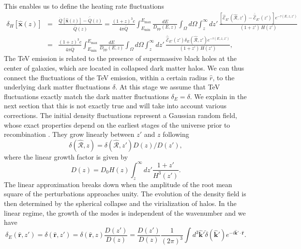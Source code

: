\documentclass[numberedappendix]{emulateapj}
\begin{document}
This enables us to define the heating rate fluctuations
\begin{eqnarray}
\label{eq:fluc_exp0}
\delta_H[\mathbf{\hat{x}}(z)]&=&\frac{\dot{Q}[\mathbf{\hat{x}}(z)]-\bar{\dot{Q}}(z)}{\bar{\dot{Q}}(z)}=\frac{(1+z)^3c}{4\pi\bar{\dot{Q}}} \int_{E_{\mathrm{min}}}^{E_{\mathrm{max}}}\frac{dE}{D_{\mathrm{pp}}(E,z)}\int_{\Omega}d\Omega\int_z^{\infty} d z'\,\frac{ \left[ \mathcal{\hat E}_{E'}(\mathbf{\hat{\mathcal{R}}}, z')-\bar{\hat{\mathcal{E}}}_{E'}(z')\right] e^{-\tau(E,z,z')}}{(1+z')\,H(z')} \nonumber\\ 
&=&\frac{(1+z)^3 c}{4\pi\bar{\dot{Q}}} \int_{E_{\mathrm{min}}}^{E_{\mathrm{max}}} \frac{dE}{D_{\mathrm{pp}}(E,z)}\int_{\Omega}d\Omega\int_z^{\infty} d z'\, \frac{\bar{\hat{\mathcal{E}}}_{E'}(z')\delta_E(\mathbf{\hat{\mathcal{R}}}, z') e^{-\tau(E,z,z')}}{(1+z')\,H(z')},
\end{eqnarray}
The TeV emission is related to the presence of supermassive black holes at the center of galaxies, which are located in collapsed dark matter halos. We can thus connect the fluctuations of the TeV emission, within a certain radius $\hat r$, to the underlying dark matter fluctuations $\delta$.
At this stage we assume that TeV fluctuations exactly match the dark matter fluctuations $\delta_E=\delta$. We explain in the next section that this is not exactly true and will take into account various corrections. The initial density fluctuations represent a Gaussian random field, whose exact properties depend on the earliest stages of the universe prior to recombination \citep{1986ApJ...304...15B,Peebles}. They grow linearly between $z'$ and $z$ following  \citep{ 1977MNRAS.179..351H}
\begin{equation}
  \label{eq:growth}
\delta(\mathbf{\hat{\mathcal{R}}}, z)=\delta(\mathbf{\hat{\mathcal{R}}}, z')D(z)/D(z'),
\end{equation}
where the linear growth factor is given by
\begin{equation}
\label{eq:growth_1}
D(z)=D_0H(z)\int_z^{\infty}dz'\frac{1+z'}{H^3(z')}.
\end{equation}
The linear approximation breaks down when the amplitude of the root mean square of the perturbations approaches unity. The evolution of the density field is then determined by the spherical collapse \citep{1972ApJ...176....1G} and the virialization of halos. In the linear regime, the growth of the modes is independent of the wavenumber and we have
\begin{equation}
\label{eq:FT_delta}
\delta_E(\mathbf{\hat{r}}, z')=\delta(\mathbf{\hat{r}}, z')
=\delta(\mathbf{\hat{r}}, z)\frac{D(z')}{D(z)}
=\frac{D(z')}{D(z)}\frac{1}{(2\pi)^3}\int d^3\mathbf{\hat k'} \tilde{\delta}(\mathbf{\hat k'}) e^{-i\mathbf{\hat k'}\cdot\mathbf{\hat r}}.
\end{equation}
\end{document}
